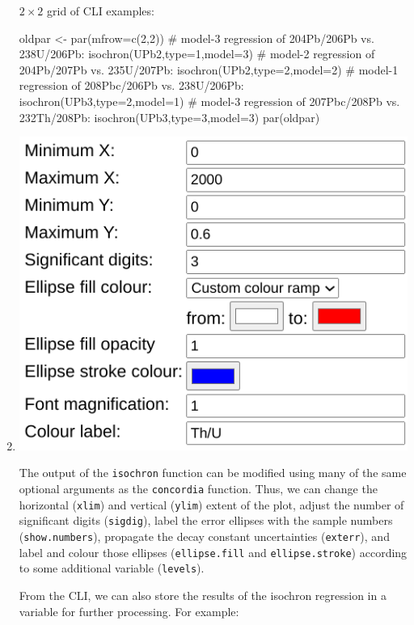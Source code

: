 \begin{refsection}
\begin{enumerate}
\noindent $2\times{2}$ grid of CLI examples:
\begin{console}
oldpar <- par(mfrow=c(2,2))
# model-3 regression of 204Pb/206Pb vs. 238U/206Pb:
isochron(UPb2,type=1,model=3)
# model-2 regression of 204Pb/207Pb vs. 235U/207Pb:
isochron(UPb2,type=2,model=2)
# model-1 regression of 208Pbc/206Pb vs. 238U/206Pb:
isochron(UPb3,type=2,model=1)
# model-3 regression of 207Pbc/208Pb vs. 232Th/208Pb:
isochron(UPb3,type=3,model=3)
par(oldpar)
\end{console}

\item \noindent\begin{minipage}[t]{.4\linewidth}
  \strut\vspace*{-\baselineskip}\newline
  \includegraphics[width=\linewidth]{../figures/UPbIsochronExtraOptions.png}\\
\end{minipage}
  \begin{minipage}[t]{.6\linewidth}
    The output of the \texttt{isochron} function can be modified using
    many of the same optional arguments as the \texttt{concordia}
    function.  Thus, we can change the horizontal (\texttt{xlim}) and
    vertical (\texttt{ylim}) extent of the plot, adjust the number of
    significant digits (\texttt{sigdig}), label the error ellipses
    with the sample numbers (\texttt{show.numbers}), propagate the
    decay constant uncertainties (\texttt{exterr}), and label and
    colour those ellipses (\texttt{ellipse.fill} and
    \texttt{ellipse.stroke}) according to some additional variable
    (\texttt{levels}).
\end{minipage}
From the CLI, we can also store the results of the isochron regression
in a variable for further processing. For example:


\end{enumerate}
\end{refsection}
